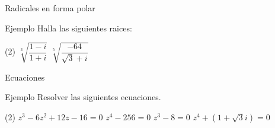 \documentclass[8pt]{beamer}
\begin{document}
\begin{frame}[t]{Radicales en forma polar}
\begin{exampleblock}{Ejemplo}
Halla las siguientes raices:
\begin{tasks}[label=\alph*)](2)	
\task $\sqrt[3]{\dfrac{1-i}{1+i}}$
\task $\sqrt[5]{\dfrac{-64}{\sqrt{3}+i}}$
\end{tasks}
\end{exampleblock}
\end{frame}

\begin{frame}[t]{Ecuaciones}
\begin{exampleblock}{Ejemplo}
Resolver las siguientes ecuaciones.
\begin{tasks}[label=\alph*)](2)
\task $z^3-6z^2+12z-16=0$
\task $z^4 -256 =0 $
\task $z^3-8=0$
\task $z^4+\left(1+\sqrt{3}i\right)=0$
\end{tasks}
\end{exampleblock}
\end{frame}
\end{document}
